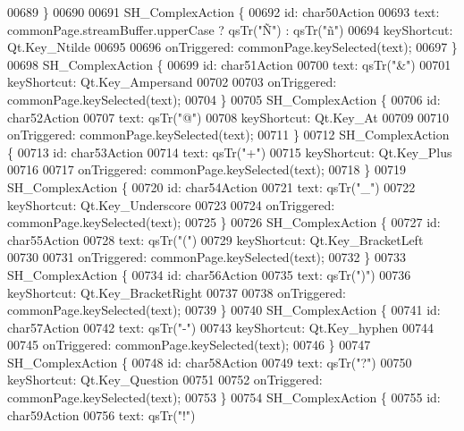 \begin{DoxyCode}
00689     \}
00690 
00691     SH\_ComplexAction \{
00692         \textcolor{keywordtype}{id}: char50Action
00693         text: commonPage.streamBuffer.upperCase ? qsTr(\textcolor{stringliteral}{"Ñ"}) : qsTr(\textcolor{stringliteral}{"ñ"})
00694         keyShortcut: Qt.Key\_Ntilde
00695 
00696         onTriggered: commonPage.keySelected(text);
00697     \}
00698     SH\_ComplexAction \{
00699         \textcolor{keywordtype}{id}: char51Action
00700         text: qsTr(\textcolor{stringliteral}{"&"})
00701         keyShortcut: Qt.Key\_Ampersand
00702 
00703         onTriggered: commonPage.keySelected(text);
00704     \}
00705     SH\_ComplexAction \{
00706         \textcolor{keywordtype}{id}: char52Action
00707         text: qsTr(\textcolor{stringliteral}{"@"})
00708         keyShortcut: Qt.Key\_At
00709 
00710         onTriggered: commonPage.keySelected(text);
00711     \}
00712     SH\_ComplexAction \{
00713         \textcolor{keywordtype}{id}: char53Action
00714         text: qsTr(\textcolor{stringliteral}{"+"})
00715         keyShortcut: Qt.Key\_Plus
00716 
00717         onTriggered: commonPage.keySelected(text);
00718     \}
00719     SH\_ComplexAction \{
00720         \textcolor{keywordtype}{id}: char54Action
00721         text: qsTr(\textcolor{stringliteral}{"\_"})
00722         keyShortcut: Qt.Key\_Underscore
00723 
00724         onTriggered: commonPage.keySelected(text);
00725     \}
00726     SH\_ComplexAction \{
00727         \textcolor{keywordtype}{id}: char55Action
00728         text: qsTr(\textcolor{stringliteral}{"("})
00729         keyShortcut: Qt.Key\_BracketLeft
00730 
00731         onTriggered: commonPage.keySelected(text);
00732     \}
00733     SH\_ComplexAction \{
00734         \textcolor{keywordtype}{id}: char56Action
00735         text: qsTr(\textcolor{stringliteral}{")"})
00736         keyShortcut: Qt.Key\_BracketRight
00737 
00738         onTriggered: commonPage.keySelected(text);
00739     \}
00740     SH\_ComplexAction \{
00741         \textcolor{keywordtype}{id}: char57Action
00742         text: qsTr(\textcolor{stringliteral}{"-"})
00743         keyShortcut: Qt.Key\_hyphen
00744 
00745         onTriggered: commonPage.keySelected(text);
00746     \}
00747     SH\_ComplexAction \{
00748         \textcolor{keywordtype}{id}: char58Action
00749         text: qsTr(\textcolor{stringliteral}{"?"})
00750         keyShortcut: Qt.Key\_Question
00751 
00752         onTriggered: commonPage.keySelected(text);
00753     \}
00754     SH\_ComplexAction \{
00755         \textcolor{keywordtype}{id}: char59Action
00756         text: qsTr(\textcolor{stringliteral}{"!"})

\end{DoxyCode}
